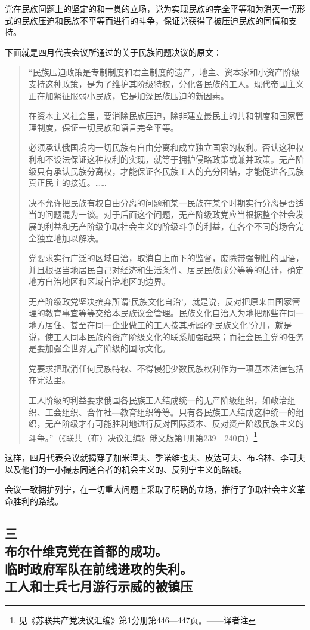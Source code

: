 党在民族问题上的坚定的和一贯的立场，党为实现民族的完全平等和为消灭一切形式的民族压迫和民族不平等而进行的斗争，保证党获得了被压迫民族的同情和支持。

下面就是四月代表会议所通过的关于民族问题决议的原文：

\begin{quotation}
“民族压迫政策是专制制度和君主制度的遗产，地主、资本家和小资产阶级支持这种政策，是为了维护其阶级特权，分化各民族的工人。现代帝国主义正在加紧征服弱小民族，它是加深民族压迫的新因素。

在资本主义社会里，要消除民族压迫，除非建立最民主的共和制度和国家管理制度，保证一切民族和语言完全平等。

必须承认俄国境内一切民族有自由分离和成立独立国家的权利。否认这种权利和不设法保证这种权利的实现，就等于拥护侵略政策或兼并政策。无产阶级只有承认民族分离权，才能保证各民族工人的充分团结，才能促进各民族真正民主的接近。……

决不允许把民族有权自由分离的问题和某一民族在某个时期实行分离是否适当的问题混为一谈。对于后面这个问题，无产阶级政党应当根据整个社会发展的利益和无产阶级争取社会主义的阶级斗争的利益，在各个不同的场合完全独立地加以解决。

党要求实行广泛的区域自治，取消自上而下的监督，废除带强制性的国语，并且根据当地居民自己对经济和生活条件、居民民族成分等等的估计，确定地方自治地区和区域自治地区的边界。

无产阶级政党坚决摈弃所谓‘民族文化自治’，就是说，反对把原来由国家管理的教育事宜等等交给本民族议会管理。民族文化自治人为地把那些在同一地方居住、甚至在同一企业做工的工人按其所属的‘民族文化’分开，就是说，使工人同本民族的资产阶级文化的联系加强起来；而社会民主党的任务是要加强全世界无产阶级的国际文化。

党要求把取消任何民族特权、不得侵犯少数民族权利作为一项基本法律包括在宪法里。

工人阶级的利益要求俄国各民族工人结成统一的无产阶级组织，如政治组织、工会组织、合作社—教育组织等等。只有各民族工人结成这种统一的组织，无产阶级才有可能胜利地进行反对国际资本、反对资产阶级民族主义的斗争。”（《联共（布）决议汇编》俄文版第1册第239—240页）\footnote{见《苏联共产党决议汇编》第1分册第446—447页。——译者注}
\end{quotation}

这样，四月代表会议就揭穿了加米涅夫、季诺维也夫、皮达可夫、布哈林、李可夫以及他们的一小撮志同道合者的机会主义的、反列宁主义的路线。

会议一致拥护列宁，在一切重大问题上采取了明确的立场，推行了争取社会主义革命胜利的路线。


\subsection[三\q 布尔什维克党在首都的成功。临时政府军队在前线进攻的失利。工人和士兵七月游行示威的被镇压]{三\\布尔什维克党在首都的成功。\\临时政府军队在前线进攻的失利。\\工人和士兵七月游行示威的被镇压}

